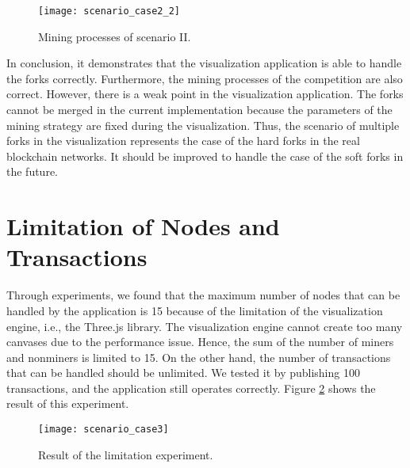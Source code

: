\begin{figure}[htb]
    \centering
    \texttt{[image: scenario\_case2\_2]}
    \caption{Mining processes of scenario II.}
    \label{fig:mining processes of scenario II}
\end{figure}

In conclusion, it demonstrates that the visualization application is able to handle the forks correctly. Furthermore, the mining processes of the competition are also correct. However, there is a weak point in the visualization application. The forks cannot be merged in the current implementation because the parameters of the mining strategy are fixed during the visualization. Thus, the scenario of multiple forks in the visualization represents the case of the hard forks in the real blockchain networks. It should be improved to handle the case of the soft forks in the future.

\section{Limitation of Nodes and Transactions}

Through experiments, we found that the maximum number of nodes that can be handled by the application is 15 because of the limitation of the visualization engine, i.e., the Three.js library. The visualization engine cannot create too many canvases due to the performance issue. Hence, the sum of the number of miners and nonminers is limited to 15. On the other hand, the number of transactions that can be handled should be unlimited. We tested it by publishing 100 transactions, and the application still operates correctly. Figure \ref{fig:result of the limitation experiment} shows the result of this experiment.

\begin{figure}[htb]
    \centering
    \texttt{[image: scenario\_case3]}
    \caption{Result of the limitation experiment.}
    \label{fig:result of the limitation experiment}
\end{figure}

